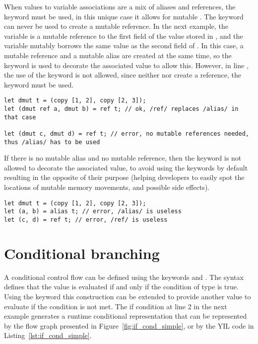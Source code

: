 When values to variable associations are a mix of aliases and references, the
keyword  must be used, in this unique case it allows for mutable
. The  keyword can never be used to create a mutable
reference. In the next example, the variable  is a mutable reference
to the first field of the value stored in , and the variable
 mutably borrows the same value as the second field of . In
this case, a mutable reference and a mutable alias are created at the same time,
so the keyword  is used to decorate the associated value to allow
this. However, in line , the use of the keyword  is not
allowed, since neither  nor  create a reference, the keyword
 must be used.

\begin{lstlisting}[style=coloredverbatim]
let dmut t = (copy [1, 2], copy [2, 3]);
let (dmut ref a, dmut b) = ref t; // ok, /ref/ replaces /alias/ in that case

let (dmut c, dmut d) = ref t; // error, no mutable references needed, thus /alias/ has to be used
\end{lstlisting}

If there is no mutable alias and no mutable reference, then the keyword is not
allowed to decorate the associated value, to avoid using the keywords by default
resulting in the opposite of their purpose (helping developers to easily spot
the locations of mutable memory movements, and possible side effects).

\begin{lstlisting}[style=coloredverbatim]
let dmut t = (copy [1, 2], copy [2, 3]);
let (a, b) = alias t; // error, /alias/ is useless
let (c, d) = ref t; // error, /ref/ is useless
\end{lstlisting}

\section{Conditional branching}%
\label{sec:if_else}

A conditional control flow can be defined using the keywords  and
. The syntax  defines that the value  is
evaluated if and only if the condition  of type  is
true. Using the keyword  this construction can be extended to
provide another value to evaluate if the condition is not met. The if condition
at line 2 in the next example generates a runtime conditional representation
that can be represented by the flow graph presented in
Figure~\ref{fig:if_cond_simple}, or by the YIL code in
Listing~\ref{lst:if_cond_simple}.

